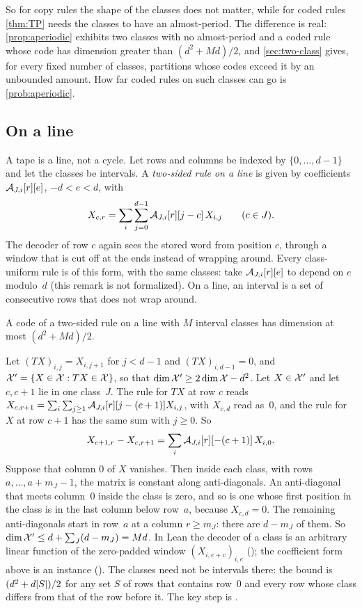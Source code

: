 So for copy rules the shape of the classes does not matter, while for coded rules \cref{thm:TP} needs the classes to
have an almost-period. The difference is real: \cref{prop:aperiodic} exhibits two classes with no almost-period and a
coded rule whose code has dimension greater than $(d^2+Md)/2$, and \cref{sec:two-class} gives, for every fixed number
of classes, partitions whose codes exceed it by an unbounded amount. How far coded rules on such classes can go is
\cref{prob:aperiodic}.

\subsection{On a line}

A tape is a line, not a cycle. Let rows and columns be indexed by $\{0,\dots,d-1\}$ and let the classes be intervals. A
\emph{two-sided rule on a line} is given by coefficients $\mathcal{A}_{J,i}[r][e]$, $-d<e<d$, with
\[
  X_{c,r}=\sum_{i}\sum_{j=0}^{d-1}\mathcal{A}_{J,i}[r][j-c]\,X_{i,j}\qquad(c\in J).
\]
The decoder of row $c$ again sees the stored word from position $c$, through a window that is cut off at the ends
instead of wrapping around. Every class-uniform rule is of this form, with the same classes: take
$\mathcal{A}_{J,i}[r][e]$ to depend on $e$ modulo~$d$ (this remark is not formalized). On a line, an interval is a set of
consecutive rows that does not wrap around.

\begin{theorem}\label{thm:line}
A code of a two-sided rule on a line with $M$ interval classes has dimension at most $(d^2+Md)/2$.
\end{theorem}

\begin{outline}
Let $(TX)_{i,j}=X_{i,j+1}$ for $j<d-1$ and $(TX)_{i,d-1}=0$, and $\mathcal{X}'=\{X\in\mathcal{X}:TX\in\mathcal{X}\}$, so that
$\dim\mathcal{X}'\ge2\dim\mathcal{X}-d^2$. Let $X\in\mathcal{X}'$ and let $c,c+1$ lie in one class~$J$. The rule for $TX$ at row $c$ reads
$X_{c,r+1}=\sum_i\sum_{j\ge1}\mathcal{A}_{J,i}[r][j-(c+1)]X_{i,j}$, with $X_{c,d}$ read as~$0$, and the rule for $X$ at row
$c+1$ has the same sum with $j\ge0$. So
\[
  X_{c+1,r}-X_{c,r+1}=\sum_i\mathcal{A}_{J,i}[r][-(c+1)]\,X_{i,0}.
\]
Suppose that column $0$ of $X$ vanishes. Then inside each class, with rows $a,\dots,a+m_J-1$, the matrix is constant
along anti-diagonals. An anti-diagonal that meets column~$0$ inside the class is zero, and so is one whose first
position in the class is in the last column below row~$a$, because $X_{c,d}=0$. The remaining anti-diagonals start in
row~$a$ at a column $r\ge m_J$: there are $d-m_J$ of them. So
$\dim\mathcal{X}'\le d+\sum_J(d-m_J)=Md$. In Lean the decoder of a class is an arbitrary linear function of the zero-padded
window $(X_{i,e+c})_{i,e}$ (); the coefficient form above is an instance
(). The classes need not be intervals there: the bound is $(d^2+d\lvert S \rvert)/2$ for any
set $S$ of rows that contains row~$0$ and every row whose class differs from that of the row before it. The key step is
.
\end{outline}


